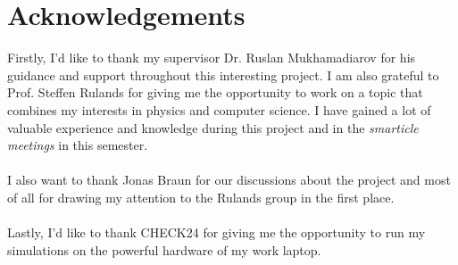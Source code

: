 \chapter*{Acknowledgements}
Firstly, I'd like to thank my supervisor Dr. Ruslan Mukhamadiarov for his guidance and support throughout this interesting project. I am also grateful to Prof. Steffen Rulands for giving me the opportunity to work on a topic that combines my interests in physics and computer science. I have gained a lot of valuable experience and knowledge during this project and in the \textit{smarticle meetings} in this semester. 
\\
\\
I also want to thank Jonas Braun for our discussions about the project and most of all for drawing my attention to the Rulands group in the first place. 
\\
\\
Lastly, I'd like to thank CHECK24 for giving me the opportunity to run my simulations on the powerful hardware of my work laptop.
